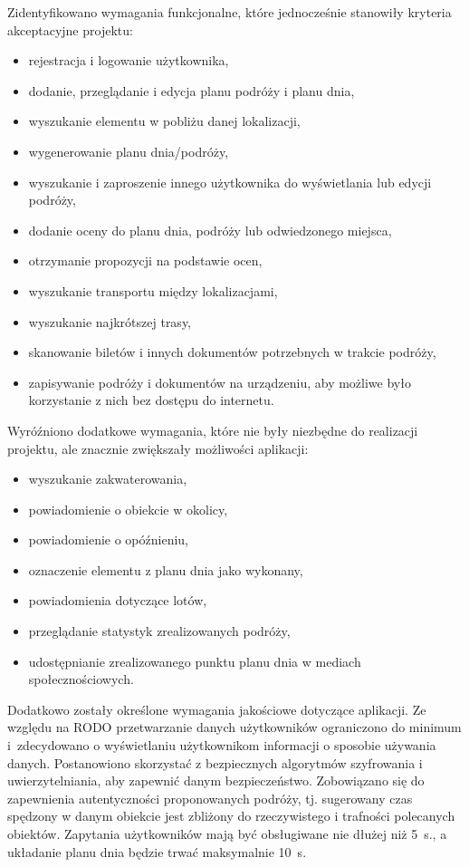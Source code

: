 \documentclass[10pt,twoside,a4paper]{report}
\begin{document}
\par
\noindent\newline Zidentyfikowano wymagania funkcjonalne, które jednocześnie stanowiły kryteria akceptacyjne projektu: 

\begin{itemize}
\item rejestracja i logowanie użytkownika,
\item dodanie, przeglądanie i edycja planu podróży i planu dnia,
\item wyszukanie elementu w pobliżu danej lokalizacji,
\item wygenerowanie planu dnia/podróży,
\item wyszukanie i zaproszenie innego użytkownika do wyświetlania lub edycji podróży,
\item dodanie oceny do planu dnia, podróży lub odwiedzonego miejsca,
\item otrzymanie propozycji na podstawie ocen,
\item wyszukanie transportu między lokalizacjami,
\item wyszukanie najkrótszej trasy,
\item skanowanie biletów i innych dokumentów potrzebnych w trakcie podróży,
\item zapisywanie podróży i dokumentów na urządzeniu, aby możliwe było korzystanie z nich bez dostępu do internetu.
\end{itemize}

\par
\noindent Wyróźniono dodatkowe wymagania, które nie były niezbędne do realizacji projektu, ale znacznie zwiększały możliwości aplikacji: 

\begin{itemize}
\item wyszukanie zakwaterowania,
\item powiadomienie o obiekcie w okolicy,
\item powiadomienie o opóźnieniu,
\item oznaczenie elementu z planu dnia jako wykonany,
\item powiadomienia dotyczące lotów,
\item przeglądanie statystyk zrealizowanych podróży,
\item udostępnianie zrealizowanego punktu planu dnia w mediach społecznościowych.
\end{itemize}

\par Dodatkowo zostały określone wymagania jakościowe dotyczące aplikacji. Ze względu na RODO przetwarzanie danych użytkowników ograniczono do minimum i~zdecydowano o wyświetlaniu użytkownikom informacji o sposobie używania danych. Postanowiono skorzystać z bezpiecznych algorytmów szyfrowania i uwierzytelniania, aby zapewnić danym bezpieczeństwo. 
Zobowiązano się do zapewnienia autentyczności proponowanych podróży, tj. sugerowany czas spędzony w danym obiekcie jest zbliżony do rzeczywistego i trafności polecanych obiektów. Zapytania użytkowników mają być obsługiwane nie dłużej niż 5~s., a układanie planu dnia będzie trwać maksymalnie 10~s.
\end{document}
